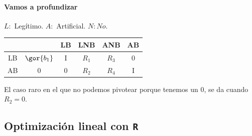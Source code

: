 \paragraph{Vamos a profundizar}
$L:$ Legítimo.
$A:$ Artificial.
$N: No$.
\begin{table}[hbtp]
\centering
\begin{tabular}{c||ccccc}
&&LB&LNB&ANB&AB\\\hline\hline
LB&$\gor{b_1}$&I&$R_1$&$R_3$&0\\
AB&0&0&$R_2$&$R_4$&I
\end{tabular}
\end{table}

El caso raro en el que no podemos pivotear porque tenemos un $0$, se da cuando $R_2 = 0$.


\subsection{Optimización lineal con {\tt R}}

